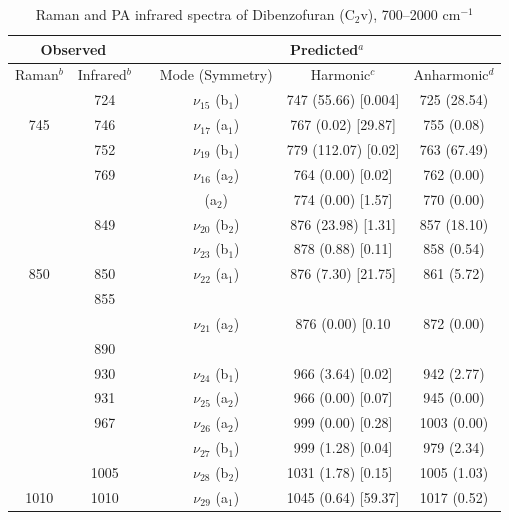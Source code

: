 \begin{table}[H]
	\caption{Raman and PA infrared spectra of Dibenzofuran (C$_{2}$v), 700–2000 cm$^{-1}$}
	\begin{center}
		\begin{threeparttable}
			\begin{tabular}{c c c c c c}
				\hline
				\multicolumn{ 2}{c}{Observed} & \multicolumn{1}{c}{} & \multicolumn{ 3}{c}{Predicted$^{a}$} \\ \hline
				Raman$^{b}$ & \multicolumn{1}{c}{Infrared$^{b}$} &  & \multicolumn{1}{c}{Mode (Symmetry)} & \multicolumn{1}{c}{Harmonic$^{c}$} & Anharmonic$^{d}$ \\ 
 & 724 &  & $\nu_{15}$ (b$_{1}$) & 747 (55.66) [0.004] & 725 (28.54) \\ 
 \multicolumn{1}{c}{745} & 746 &  & \multicolumn{1}{c}{ $\nu_{17}$ (a$_{1}$)
 } & 767 (0.02) [29.87] & 755 (0.08) \\ 
 & 752 &  & $\nu_{19}$ (b$_{1}$) & 779 (112.07) [0.02] & 763 (67.49) \\ 
 & 769 &  & $\nu_{16}$ (a$_{2}$) & 764 (0.00) [0.02] & 762 (0.00) \\ 
 & \multicolumn{1}{c}{} &  & (a$_{2}$) & 774 (0.00) [1.57] & 770 (0.00) \\ 
 & 849 &  & $\nu_{20}$ (b$_{2}$) & 876 (23.98) [1.31] & 857 (18.10) \\ 
 & \multicolumn{1}{c}{} &  & $\nu_{23}$ (b$_{1}$) & 878 (0.88) [0.11] & 858 (0.54) \\
 \multicolumn{1}{c}{850} & 850 &  & $\nu_{22}$ (a$_{1}$) & 876 (7.30) [21.75] & 861 (5.72) \\ 
 & 855 &  &  &  &  \\ 
 & \multicolumn{1}{l}{} &  & $\nu_{21}$ (a$_{2}$) & 876 (0.00) [0.10 & 872 (0.00) \\ 
 & 890 &  &  &  &  \\ 
 & 930 &  & $\nu_{24}$ (b$_{1}$) & 966 (3.64) [0.02] & 942 (2.77) \\ 
 & 931 &  & $\nu_{25}$ (a$_{2}$) & 966 (0.00) [0.07] & 945 (0.00) \\ 
 & \multicolumn{1}{c}{967} &  & $\nu_{26}$ (a$_{2}$)& 999 (0.00) [0.28] & 1003 (0.00) \\
 &  &  & $\nu_{27}$ (b$_{1}$) &  999 (1.28) [0.04] & 979 (2.34) \\ 
 & 1005 &  & \multicolumn{1}{c}{ $\nu_{28}$ (b$_{2}$)} & \multicolumn{1}{l}{1031 (1.78) [0.15]} & 1005 (1.03) \\ 
 \multicolumn{1}{c}{1010} & 1010 &  & $\nu_{29}$ (a$_{1}$)
 & 1045 (0.64) [59.37] & 1017 (0.52) \\ 

\end{tabular}
\end{threeparttable}
\end{center}
\end{table}

